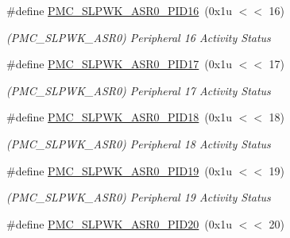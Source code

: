 \begin{DoxyCompactItemize}
\mbox{\label{group__SAMS70__PMC_ga8152787ef2359f80ad8c2d2f4db429db}} 
\#define \mbox{\hyperlink{group__SAMS70__PMC_ga8152787ef2359f80ad8c2d2f4db429db}{P\+M\+C\+\_\+\+S\+L\+P\+W\+K\+\_\+\+A\+S\+R0\+\_\+\+P\+I\+D16}}~(0x1u $<$$<$ 16)
\begin{DoxyCompactList}\small\item\em (P\+M\+C\+\_\+\+S\+L\+P\+W\+K\+\_\+\+A\+S\+R0) Peripheral 16 Activity Status \end{DoxyCompactList}\item 
\mbox{\label{group__SAMS70__PMC_gaa659ed2d3895acf83e0efcfd9bb561c1}} 
\#define \mbox{\hyperlink{group__SAMS70__PMC_gaa659ed2d3895acf83e0efcfd9bb561c1}{P\+M\+C\+\_\+\+S\+L\+P\+W\+K\+\_\+\+A\+S\+R0\+\_\+\+P\+I\+D17}}~(0x1u $<$$<$ 17)
\begin{DoxyCompactList}\small\item\em (P\+M\+C\+\_\+\+S\+L\+P\+W\+K\+\_\+\+A\+S\+R0) Peripheral 17 Activity Status \end{DoxyCompactList}\item 
\mbox{\label{group__SAMS70__PMC_ga8c5ef4dc4783f64e8b0801b824993449}} 
\#define \mbox{\hyperlink{group__SAMS70__PMC_ga8c5ef4dc4783f64e8b0801b824993449}{P\+M\+C\+\_\+\+S\+L\+P\+W\+K\+\_\+\+A\+S\+R0\+\_\+\+P\+I\+D18}}~(0x1u $<$$<$ 18)
\begin{DoxyCompactList}\small\item\em (P\+M\+C\+\_\+\+S\+L\+P\+W\+K\+\_\+\+A\+S\+R0) Peripheral 18 Activity Status \end{DoxyCompactList}\item 
\mbox{\label{group__SAMS70__PMC_gafa8d37c0c66e77cba10ba30705e84c0f}} 
\#define \mbox{\hyperlink{group__SAMS70__PMC_gafa8d37c0c66e77cba10ba30705e84c0f}{P\+M\+C\+\_\+\+S\+L\+P\+W\+K\+\_\+\+A\+S\+R0\+\_\+\+P\+I\+D19}}~(0x1u $<$$<$ 19)
\begin{DoxyCompactList}\small\item\em (P\+M\+C\+\_\+\+S\+L\+P\+W\+K\+\_\+\+A\+S\+R0) Peripheral 19 Activity Status \end{DoxyCompactList}\item 
\mbox{\label{group__SAMS70__PMC_ga114081446573726684cd5acd66fda51d}} 
\#define \mbox{\hyperlink{group__SAMS70__PMC_ga114081446573726684cd5acd66fda51d}{P\+M\+C\+\_\+\+S\+L\+P\+W\+K\+\_\+\+A\+S\+R0\+\_\+\+P\+I\+D20}}~(0x1u $<$$<$ 20)
$$
\end{DoxyCompactItemize}

